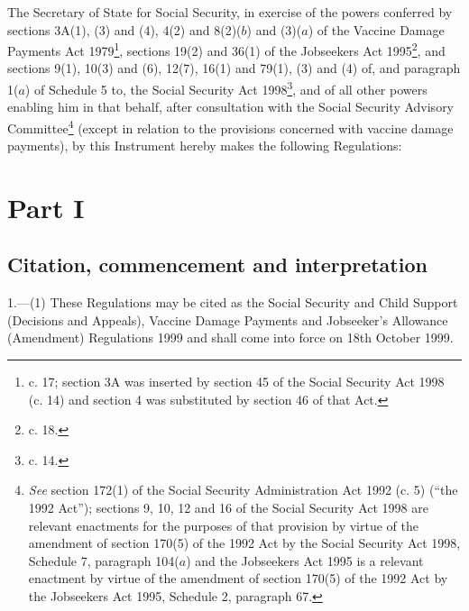 \documentclass[12pt,a4paper]{article}
\title{\regstitle}
\author{S.I. 1999 No. 2677}
\date{Made
27th September 1999\\
Laid before Parliament
27th September 1999\\
Coming into force
18th October 1999}
\begin{document}
\maketitle

\noindent
The Secretary of State for Social Security, in exercise of the powers conferred by sections 3A(1), (3) and (4), 4(2) and 8(2)($b$) and (3)($a$) of the Vaccine Damage Payments Act 1979\footnote{ c. 17; section 3A was inserted by section 45 of the Social Security Act 1998 (c. 14) and section 4 was substituted by section 46 of that Act.}, sections 19(2) and 36(1) of the Jobseekers Act 1995\footnote{ c. 18.}, and sections 9(1), 10(3) and (6), 12(7), 16(1) and 79(1), (3) and (4) of, and paragraph 1($a$) of Schedule 5 to, the Social Security Act 1998\footnote{ c. 14.}, and of all other powers enabling him in that behalf, after consultation with the Social Security Advisory Committee\footnote{\frenchspacing \emph{See} section 172(1) of the Social Security Administration Act 1992 (c. 5) (“the 1992 Act”); sections 9, 10, 12 and 16 of the Social Security Act 1998 are relevant enactments for the purposes of that provision by virtue of the amendment of section 170(5) of the 1992 Act by the Social Security Act 1998, Schedule 7, paragraph 104($a$) and the Jobseekers Act 1995 is a relevant enactment by virtue of the amendment of section 170(5) of the 1992 Act by the Jobseekers Act 1995, Schedule 2, paragraph 67.} (except in relation to the provisions concerned with vaccine damage payments), by this Instrument hereby makes the following Regulations: 

{\sloppy

\tableofcontents

}

\bigskip

\setcounter{secnumdepth}{-2}

\section{Part I}

\renewcommand\parthead{--- Part I}

\subsection[1. Citation, commencement and interpretation]{Citation, commencement and interpretation}

1.---(1)  These Regulations may be cited as the Social Security and Child Support (Decisions and Appeals), Vaccine Damage Payments and Jobseeker’s Allowance (Amendment) Regulations 1999 and shall come into force on 18th October 1999.
\end{document}
